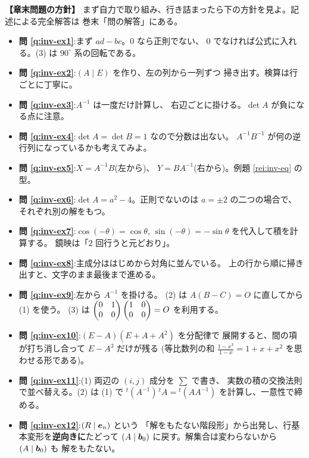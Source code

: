 \bigskip
{\small
\noindent\textbf{【章末問題の方針】}\quad
まず自力で取り組み、行き詰まったら下の方針を見よ。記述による完全解答は
巻末「問の解答」にある。
\begin{itemize}
\item \textbf{問 \ref{q:inv-ex1}}:まず $ad - bc$。$0$ なら正則でない、
$0$ でなければ公式に入れる。(3) は $90^\circ$ 系の回転である。
\item \textbf{問 \ref{q:inv-ex2}}:$(A \mid E)$ を作り、左の列から一列ずつ
掃き出す。検算は行ごとに丁寧に。
\item \textbf{問 \ref{q:inv-ex3}}:$A^{-1}$ は一度だけ計算し、
右辺ごとに掛ける。$\det A$ が負になる点に注意。
\item \textbf{問 \ref{q:inv-ex4}}:$\det A = \det B = 1$ なので分数は出ない。
$A^{-1}B^{-1}$ が何の逆行列になっているかも考えてみよ。
\item \textbf{問 \ref{q:inv-ex5}}:$X = A^{-1}B$(左から)、
$Y = BA^{-1}$(右から)。例題 \ref{rei:inv-eq} の型。
\item \textbf{問 \ref{q:inv-ex6}}:$\det A = a^2 - 4$。正則でないのは
$a = \pm 2$ の二つの場合で、それぞれ別の解をもつ。
\item \textbf{問 \ref{q:inv-ex7}}:$\cos(-\theta) = \cos\theta$,
$\sin(-\theta) = -\sin\theta$ を代入して積を計算する。
鏡映は「$2$ 回行うと元どおり」。
\item \textbf{問 \ref{q:inv-ex8}}:主成分ははじめから対角に並んでいる。
上の行から順に掃き出すと、文字のまま最後まで進める。
\item \textbf{問 \ref{q:inv-ex9}}:左から $A^{-1}$ を掛ける。
(2) は $A(B - C) = O$ に直してから (1) を使う。
(3) は $\begin{pmatrix}0 & 1 \\ 0 & 0\end{pmatrix}\begin{pmatrix}1 & 0 \\ 0 & 0\end{pmatrix} = O$ を利用する。
\item \textbf{問 \ref{q:inv-ex10}}:$(E - A)(E + A + A^2)$ を分配律で
展開すると、間の項が打ち消し合って $E - A^3$ だけが残る
(等比数列の和 $\frac{1 - x^3}{1 - x} = 1 + x + x^2$ を思わせる形である)。
\item \textbf{問 \ref{q:inv-ex11}}:(1) 両辺の $(i,j)$ 成分を $\sum$ で書き、
実数の積の交換法則で並べ替える。(2) は (1) で
${}^t(A^{-1})\,{}^t\!A = {}^t(AA^{-1})$ を計算し、一意性で締める。
\item \textbf{問 \ref{q:inv-ex12}}:$(R \mid \bm{e}_n)$ という
「解をもたない階段形」から出発し、行基本変形を\textbf{逆向きに}たどって
$(A \mid \bm{b}_0)$ に戻す。解集合は変わらないから $(A \mid \bm{b}_0)$ も
解をもたない。
\end{itemize}
}

